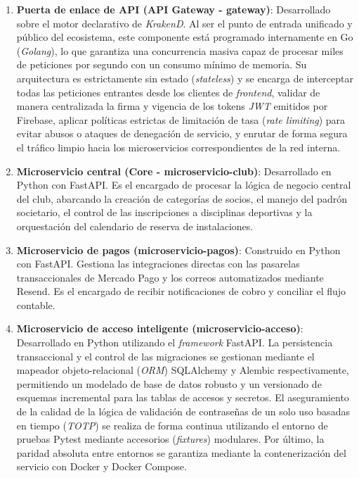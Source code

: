 \begin{enumerate}
    \item \textbf{Puerta de enlace de API (API Gateway - gateway)}: Desarrollado sobre el motor declarativo de \textit{KrakenD}. Al ser el punto de entrada unificado y público del ecosistema, este componente está programado internamente en Go (\textit{Golang}), lo que garantiza una concurrencia masiva capaz de procesar miles de peticiones por segundo con un consumo mínimo de memoria. Su arquitectura es estrictamente sin estado (\textit{stateless}) y se encarga de interceptar todas las peticiones entrantes desde los clientes de \textit{frontend}, validar de manera centralizada la firma y vigencia de los tokens \textit{JWT} emitidos por Firebase, aplicar políticas estrictas de limitación de tasa (\textit{rate limiting}) para evitar abusos o ataques de denegación de servicio, y enrutar de forma segura el tráfico limpio hacia los microservicios correspondientes de la red interna.
    \item \textbf{Microservicio central (Core - microservicio-club)}: Desarrollado en Python con FastAPI. Es el encargado de procesar la lógica de negocio central del club, abarcando la creación de categorías de socios, el manejo del padrón societario, el control de las inscripciones a disciplinas deportivas y la orquestación del calendario de reserva de instalaciones.
    \item \textbf{Microservicio de pagos (microservicio-pagos)}: Construido en Python con FastAPI. Gestiona las integraciones directas con las pasarelas transaccionales de Mercado Pago y los correos automatizados mediante Resend. Es el encargado de recibir notificaciones de cobro y conciliar el flujo contable.
    \newpage
    \item \textbf{Microservicio de acceso inteligente (microservicio-acceso)}: Desarrollado en Python utilizando el \textit{framework} FastAPI. La persistencia transaccional y el control de las migraciones se gestionan mediante el mapeador objeto-relacional (\textit{ORM}) SQLAlchemy y Alembic respectivamente, permitiendo un modelado de base de datos robusto y un versionado de esquemas incremental para las tablas de accesos y secretos. El aseguramiento de la calidad de la lógica de validación de contraseñas de un solo uso basadas en tiempo (\textit{TOTP}) se realiza de forma continua utilizando el entorno de pruebas Pytest mediante accesorios (\textit{fixtures}) modulares. Por último, la paridad absoluta entre entornos se garantiza mediante la contenerización del servicio con Docker y Docker Compose.

\end{enumerate}
